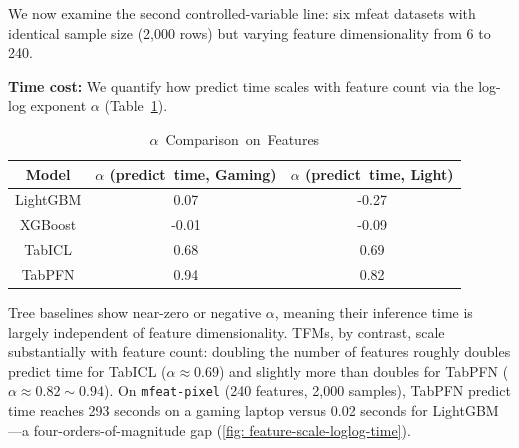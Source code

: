 \documentclass{SYSUReport}
\begin{document}
We now examine the second controlled-variable line: six mfeat datasets with identical sample size (2,000 rows) but varying feature dimensionality from 6 to 240.







\textbf{Time cost:} We quantify how predict time scales with feature count via the log-log exponent $\alpha$ (Table~\ref{tab: time-cost-feature}).


\begin{table}[H]
    \centering
    \caption{$\alpha$\ Comparison\ on\ Features}
    \label{tab: time-cost-feature}
    \begin{tabular}{ccc}
    \hline
    Model & $\alpha$ (predict\ time, Gaming) & $\alpha$ (predict\ time, Light) \\
    \hline
    LightGBM  & 0.07 & -0.27 \\
    XGBoost & -0.01 & -0.09 \\
    TabICL & 0.68 & 0.69 \\
    TabPFN & 0.94 & 0.82 \\
    \hline
    \end{tabular}
\end{table}


Tree baselines show near-zero or negative $\alpha$, meaning their inference time is largely independent of feature dimensionality. TFMs, by contrast, scale substantially with feature count: doubling the number of features roughly doubles predict time for TabICL ($\alpha \approx 0.69$) and slightly more than doubles for TabPFN ($\alpha \approx 0.82\sim 0.94$). On \texttt{mfeat-pixel} (240 features, 2,000 samples), TabPFN predict time reaches 293 seconds on a gaming laptop versus 0.02 seconds for LightGBM---a four-orders-of-magnitude gap (\autoref{fig: feature-scale-loglog-time}).
\end{document}
